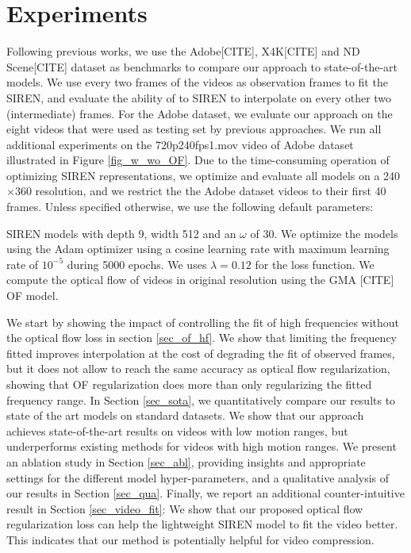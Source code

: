 \documentclass{article}
\begin{document}
\section{Experiments}

Following previous works, we use the Adobe[CITE], X4K[CITE] and ND Scene[CITE] dataset as benchmarks to compare our approach to state-of-the-art models.
We use every two frames of the videos as observation frames to fit the SIREN,
and evaluate the ability of to SIREN to interpolate on every other two (intermediate) frames.
For the Adobe dataset, we evaluate our approach on the eight videos that were used as testing set by previous approaches.
We run all additional experiments on the 720p240fps1.mov video of Adobe dataset illustrated in Figure \ref{fig_w_wo_OF}.
Due to the time-consuming operation of optimizing SIREN representations,
we optimize and evaluate all models on a 240$\times$360 resolution,
and we restrict the the Adobe dataset videos to their first 40 frames.
Unless specified otherwise, we use the following default parameters:

SIREN models with depth 9, width 512 and an $\omega$ of 30.
We optimize the models using the Adam optimizer using a cosine learning rate with maximum learning rate of $10^{-5}$ during 5000 epochs.
We uses $\lambda = 0.12$ for the loss function. We compute the optical flow of videos in original resolution using the GMA [CITE] OF model.

We start by showing the impact of controlling the fit of high frequencies without the optical flow loss in section \ref{sec_of_hf}.
We show that limiting the frequency fitted improves interpolation at the cost of degrading the fit of observed frames,
but it does not allow to reach the same accuracy as optical flow regularization,
showing that OF regularization does more than only regularizing the fitted frequency range.
In Section \ref{sec_sota}, we quantitatively compare our results to state of the art models on standard datasets.
We show that our approach achieves state-of-the-art results on videos with low motion ranges,
but underperforms existing methods for videos with high motion ranges.
We present an ablation study in Section \ref{sec_abl},
providing insights and appropriate settings for the different model hyper-parameters,
and a qualitative analysis of our results in Section \ref{sec_qua}.
Finally, we report an additional counter-intuitive result in Section \ref{sec_video_fit}:
We show that our proposed optical flow regularization loss can help the lightweight SIREN model to fit the video better.
This indicates that our method is potentially helpful for video compression.
\end{document}
